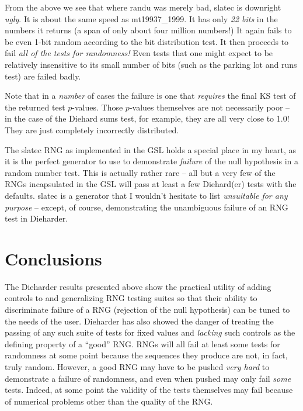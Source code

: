 \documentclass[12pt]{article}
\begin{document}
From the above we see that where randu was merely bad, slatec is
downright {\em ugly}.  It is about the same speed as mt19937\_1999.  It
has only {\em 22 bits} in the numbers it returns (a span of only about
four million numbers!)  It again fails to be even 1-bit random according
to the bit distribution test.  It then proceeds to fail {\em all of the
tests for randomness!} Even tests that one might expect to be relatively
insensitive to its small number of bits (such as the parking lot and
runs test) are failed badly.

Note that in a {\em number} of cases the failure is one that {\em
requires} the final KS test of the returned test $p$-values.  Those
$p$-values themselves are not necessarily poor -- in the case of the
Diehard sums test, for example, they are all very close to 1.0!  They
are just completely incorrectly distributed.

The slatec RNG as implemented in the GSL holds a special place in my
heart, as it is the perfect generator to use to demonstrate {\em
failure} of the null hypothesis in a random number test.  This is
actually rather rare -- all but a very few of the RNGs incapsulated in
the GSL will pass at least a few Diehard(er) tests with the defaults.
slatec is a generator that I wouldn't hesitate to list {\em unsuitable
for any purpose} -- except, of course, demonstrating the unambiguous
failure of an RNG test in Dieharder.

\section{Conclusions}

The Dieharder results presented above show the practical utility of
adding controls to and generalizing RNG testing suites so that their
ability to discriminate failure of a RNG (rejection of the null
hypothesis) can be tuned to the needs of the user.  Dieharder has also
showed the danger of treating the passing of any such suite of tests for
fixed values and {\em lacking} such controls as the defining property of
a ``good'' RNG.  RNGs will all fail at least some tests for randomness
at some point because the sequences they produce are not, in fact, truly
random.  However, a good RNG may have to be pushed {\em very hard} to
demonstrate a failure of randomness, and even when pushed may only fail
{\em some} tests.  Indeed, at some point the validity of the tests
themselves may fail because of numerical problems other than the quality
of the RNG.
\end{document}
